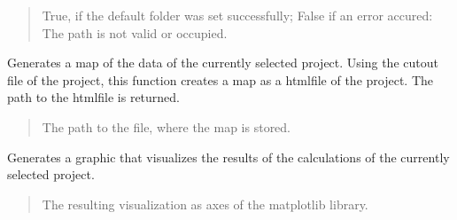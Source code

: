 \documentclass[letterpaper,10pt,english]{sphinxmanual}
\begin{document}
\begin{fulllineitems}
\begin{fulllineitems}
\begin{quote}
\begin{description}
\sphinxAtStartPar
True, if the default folder was set successfully; False if an error accured: The path is not valid or occupied.

\sphinxAtStartPar
{}

\end{description}\end{quote}

\end{fulllineitems}


\begin{fulllineitems}
\label{\detokenize{apidoc/src.osm_configurator.control:src.osm_configurator.control.control.Control.generate_cut_out_map}}
\pysigstartsignatures
{}
\pysigstopsignatures
\sphinxAtStartPar
Generates a map of the data of the currently selected project.
Using the cut\sphinxhyphen{}out file of the project, this function creates a map as a html\sphinxhyphen{}file of the project. The path to the html\sphinxhyphen{}file is returned.
\begin{quote}\begin{description}
\sphinxAtStartPar
The path to the file, where the map is stored.

\sphinxAtStartPar
{}

\end{description}\end{quote}

\end{fulllineitems}


\begin{fulllineitems}
\label{\detokenize{apidoc/src.osm_configurator.control:src.osm_configurator.control.control.Control.get_calculation_visualization}}
\pysigstartsignatures
{}
\pysigstopsignatures
\sphinxAtStartPar
Generates a graphic that visualizes the results of the calculations of the currently selected project.
\begin{quote}\begin{description}
\sphinxAtStartPar
The resulting visualization as axes of the matplotlib library.


\end{description}
\end{quote}
\end{fulllineitems}
\end{fulllineitems}
\end{document}
